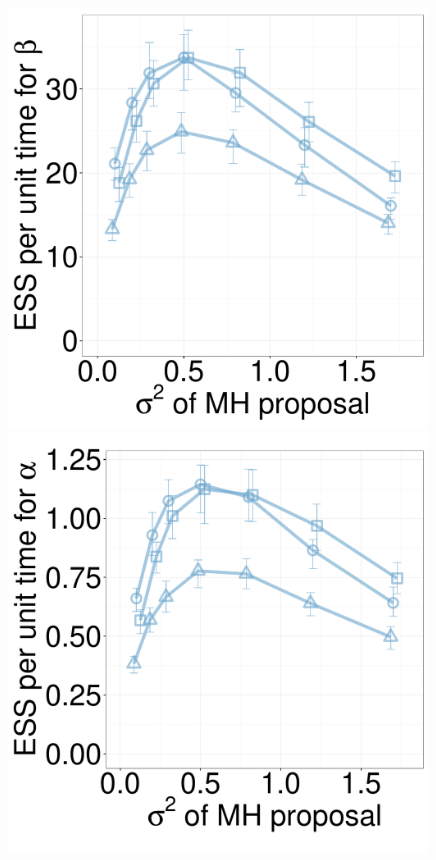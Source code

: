 \begin{figure}[H]
\begin{minipage}[hp]{0.24\linewidth}
    \includegraphics [width=0.99\textwidth, angle=0]{figs/new_whole_exp_figs/mh_exp_beta_dim3.pdf}
	\end{minipage}
  \begin{minipage}[hp]{0.24\linewidth}
  \centering
    \includegraphics [width=0.99\textwidth, angle=0]{figs/new_whole_exp_figs/mh_exp_alpha_dim10.pdf}

\end{minipage}
\end{figure}
